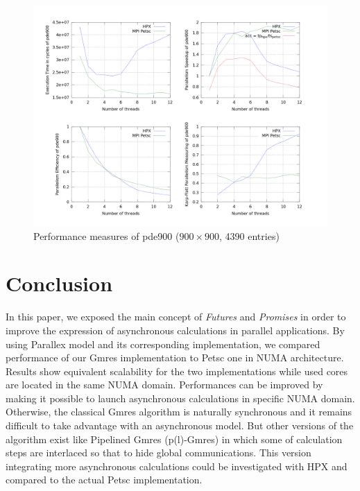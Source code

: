 \documentclass[smallextended]{svjour3}
\begin{document}
\begin{figure}[h!]
\begin{center}
\includegraphics[scale=0.25]{Images/pde900.png}
\end{center}
\caption{Performance measures of pde900 ($900\times900$, 4390 entries)}
\label{pde900}
\end{figure}

\newpage

\section{Conclusion}
In this paper, we exposed the main concept of \emph{Futures} and \emph{Promises} in order to improve the expression of asynchronous calculations in parallel applications. By using Parallex model and its corresponding implementation, we compared performance of our Gmres implementation to Petsc one in NUMA architecture. Results show equivalent scalability for the two implementations while used cores are located in the same NUMA domain. Performances can be improved by making it possible to launch asynchronous calculations in specific NUMA domain. Otherwise, the classical Gmres algorithm is naturally synchronous and it remains difficult to take advantage with an asynchronous model. But other versions of the algorithm exist like Pipelined Gmres (p(l)-Gmres) \cite{Parall_GMRES} in which some of calculation steps are interlaced so that to hide global communications. This version integrating more asynchronous calculations could be investigated with HPX and compared to the actual Petsc implementation.



\end{document}
